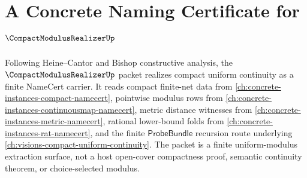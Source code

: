 \chapter{A Concrete Naming Certificate for $\CompactModulusRealizerUp$}
\label{ch:concrete-instances-compact-modulus-realizer-namecert}

Following Heine--Cantor and Bishop constructive analysis, the $\CompactModulusRealizerUp$ packet realizes compact uniform continuity as a finite NameCert carrier. It reads compact finite-net data from \autoref{ch:concrete-instances-compact-namecert}, pointwise modulus rows from \autoref{ch:concrete-instances-continuousmap-namecert}, metric distance witnesses from \autoref{ch:concrete-instances-metric-namecert}, rational lower-bound folds from \autoref{ch:concrete-instances-rat-namecert}, and the finite $\mathsf{ProbeBundle}$ recursion route underlying \autoref{ch:visions-compact-uniform-continuity}. The packet is a finite uniform-modulus extraction surface, not a host open-cover compactness proof, semantic continuity theorem, or choice-selected modulus.

